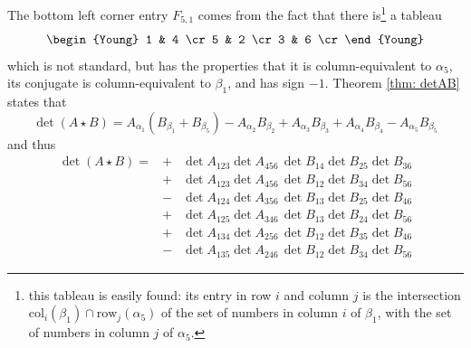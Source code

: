 \documentclass[10pt]{amsart}
\theoremstyle{definition}
\theoremstyle{remark}
\numberwithin{equation}{section}
\newcommand{\0}{\color{blue}{\mathsf{0}}}
\begin{document}
The bottom left corner entry $F_{5,1}$ comes from the fact that there is\footnote{this tableau is easily found: its entry in row $i$ and column $j$  is   the intersection $\mathrm{col}_i(\beta_1) \cap \mathrm{row}_j(\alpha_5)$ of  the set of numbers in column $i$ of $\beta_1$, with the set of numbers in column $j$ of $\alpha_5$.} a  tableau
\[    
\begin{Young}
1 & 4 \cr
5 & 2 \cr
3  & 6 \cr
\end{Young}
\]
which is not standard, but has  the properties that it is column-equivalent to $\alpha_5$, its conjugate is column-equivalent to $\beta_1$, and has sign $-1$.
Theorem \ref{thm: detAB} states that 
\[ \det(A \star B) = A_{\alpha_1} \left(  B_{\beta_1}   + B_{\beta_5}\right) - A_{\alpha_2} B_{\beta_2} + A_{\alpha_3}B_{\beta_3} + A_{\alpha_4} B_{\beta_4} - A_{\alpha_5} B_{\beta_5} \]
and thus
 \begin{eqnarray}  \det( A\star B)    =      &  + &  \det A_{123}  \det A_{456}  \,  \det B_{14} \det B_{25} \det B_{36}   \nonumber  \\
  &  + &  \det A_{123}  \det A_{456}  \,  \det B_{12} \det B_{34} \det B_{56}   \nonumber  \\
  & -  &  \det A_{124}  \det A_{356}  \,  \det B_{13} \det B_{25} \det B_{46}   \nonumber  \\
   &  + &  \det A_{125}  \det A_{346}  \,  \det B_{13} \det B_{24} \det B_{56}   \nonumber  \\
 & +  & \det A_{134} \det A_{256}  \,  \det B_{12} \det B_{35} \det B_{46}   \nonumber  \\
      &     - & \det A_{135} \det A_{246}  \,  \det B_{12} \det B_{34} \det B_{56} \nonumber 
  \end{eqnarray}
\end{document}

